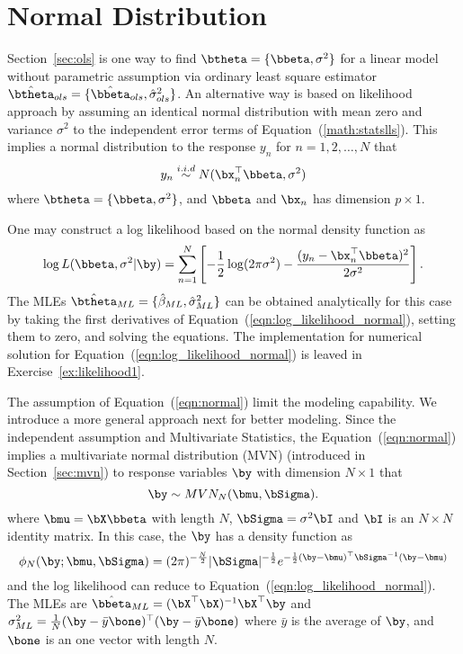 \section{Normal Distribution}

Section~\ref{sec:ols} is one way to find
$\btheta = \{\bbeta,\sigma^2\}$ for a linear model
without parametric assumption via ordinary least square estimator
$\hat{\btheta}_{ols} = \{\hat{\bbeta}_{ols},\hat{\sigma}_{ols}^2\}$.
An alternative way is based on likelihood approach by
assuming an identical normal distribution with mean zero and
variance $\sigma^2$ to the independent error terms of
Equation~(\ref{math:statslls}).
This implies a normal distribution
to the response $y_n$ for $n=1,2,\ldots, N$ that
\begin{equation}
y_n \stackrel{i.i.d}{\sim} N(\bx_n^\top\bbeta, \sigma^2)
\label{eqn:normal}
\end{equation}
where $\btheta = \{\bbeta, \sigma^2\}$, and
$\bbeta$ and $\bx_n$ has dimension $p\times 1$.

One may construct a log likelihood based on the normal density function as
\begin{equation}
\log L(\bbeta, \sigma^2|\by) = \sum_{n = 1}^N
\left[
-\frac{1}{2} \log (2\pi \sigma^2) -
\frac{(y_n - \bx_n^\top\bbeta)^2}{2\sigma^2}
\right].
\label{eqn:log_likelihood_normal}
\end{equation}
The MLEs
$\hat{\btheta}_{ML} = \{\hat{\beta}_{ML}, \hat{\sigma}^2_{ML}\}$
can be obtained analytically for this case by
taking the first derivatives of Equation~(\ref{eqn:log_likelihood_normal}),
setting them to zero, and
solving the equations.
The implementation for numerical solution for
Equation~(\ref{eqn:log_likelihood_normal}) is leaved in
Exercise~\ref{ex:likelihood1}.

The assumption of Equation~(\ref{eqn:normal}) limit the modeling capability.
We introduce a more general approach next for better
modeling.
Since the independent assumption and Multivariate Statistics, the
Equation~(\ref{eqn:normal})
implies a multivariate normal distribution
(MVN)
(introduced in Section~\ref{sec:mvn})
to response variables $\by$ with dimension $N\times 1$ that
\begin{equation}
\by \sim MVN_N(\bmu, \bSigma).
\label{eqn:mvn_n}
\end{equation}
where $\bmu = \bX\bbeta$ with length $N$,
$\bSigma = \sigma^2 \bI$ and $\bI$ is an $N\times N$ identity matrix.
In this case, the $\by$ has a density function as
\begin{equation*}
\displaystyle
\phi_N(\by; \bmu, \bSigma) =
(2\pi)^{-\frac{N}{2}} |\bSigma|^{-\frac{1}{2}}
e^{-\frac{1}{2} (\by - \bmu)^\top \bSigma^{-1} (\by - \bmu)}
\end{equation*}
and the log likelihood can reduce to
Equation~(\ref{eqn:log_likelihood_normal}).
The MLEs are
$\hat{\bbeta}_{ML} = (\bX^\top \bX)^{-1} \bX^\top \by$ and
$\sigma^2_{ML} = \frac{1}{N} (\by - \bar{y}\bone)^\top(\by - \bar{y}\bone)$
where $\bar{y}$ is the average of $\by$,
and $\bone$ is an one vector with length $N$.




